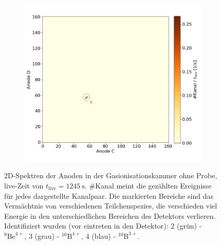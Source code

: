 \begin{figure}[H]
\begin{subfigure}{0.47\textwidth}
    \end{subfigure}
    \begin{subfigure}{0.47\textwidth}
        \centering
        \includegraphics[width=\linewidth]{Pictures/Gasdetektor/3_blank_CD.png}
    \end{subfigure}
    \caption{2D-Spektren der Anoden in der Gasionisationskammer ohne Probe, live-Zeit von $t_{\text{live}} = \SI{1245}{\second}$. \#Kanal meint die gezählten Ereignisse für jedes dargestellte Kanalpaar. Die markierten Bereiche sind das Vermächtnis von verschiedenen Teilchenspezies, die verschieden viel Energie in den unterschiedlichen Bereichen des Detektors verlieren. Identifiziert wurden (vor eintreten in den Detektor): 2 (grün) - $^{9}\text{Be}^{4+}$, 3 (grau) - $^{10}\text{B}^{4+}$, 4 (blau) - $^{10}\text{B}^{3+}$.}
    \label{Auswertung_Gasdetektor_2DSpektren_blank}
\end{figure}
